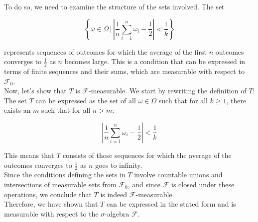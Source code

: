 \begin{solution}
    To do so, we need to examine the structure of the sets involved. The set 

    \[
    \left\{ \omega \in \Omega \, \bigg| \, \left| \frac{1}{n} \sum_{i=1}^{n} \omega_i - \frac{1}{2} \right| < \frac{1}{k} \right\}
    \]
    
    represents sequences of outcomes for which the average of the first \( n \) outcomes converges to \( \frac{1}{2} \) as \( n \) becomes large. This is a condition that can be expressed in terms of finite sequences and their sums, which are measurable with respect to \( \mathcal{F}_0 \).\\
    
    Now, let's show that \( T \) is \( \mathcal{F} \)-measurable. We start by rewriting the definition of \( T \): The set \( T \) can be expressed as the set of all \( \omega \in \Omega \) such that for all \( k \geq 1 \), there exists an \( m \) such that for all \( n > m \):
    
    \[
    \left| \frac{1}{n} \sum_{i=1}^{n} \omega_i - \frac{1}{2} \right| < \frac{1}{k}
    \]
    
    This means that \( T \) consists of those sequences for which the average of the outcomes converges to \( \frac{1}{2} \) as \( n \) goes to infinity.\\
    
    Since the conditions defining the sets in \( T \) involve countable unions and intersections of measurable sets from \( \mathcal{F}_0 \), and since \( \mathcal{F} \) is closed under these operations, we conclude that \( T \) is indeed \( \mathcal{F} \)-measurable.\\
    
    Therefore, we have shown that \( T \) can be expressed in the stated form and is measurable with respect to the \( \sigma \)-algebra \( \mathcal{F} \).
\end{solution}